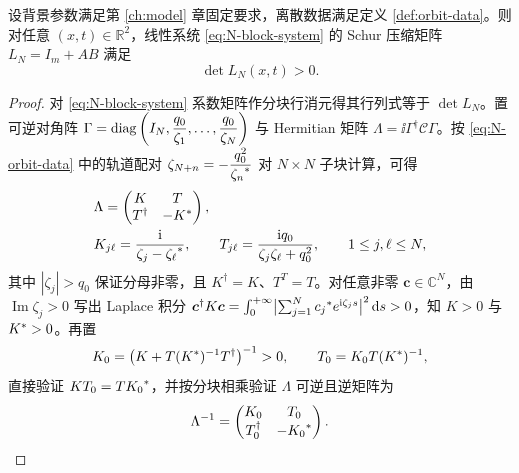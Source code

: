 \begin{lemma}\label{lem:general-N-nondegeneracy}
设背景参数满足第 \ref{ch:model} 章固定要求，离散数据满足定义 \ref{def:orbit-data}。则对任意 $(x,t)\in\mathbb R^2$，线性系统 \eqref{eq:N-block-system} 的 Schur 压缩矩阵 $L_N=I_m+AB$ 满足
\begin{equation}\label{eq:general-N-positive}
\det L_N(x,t)>0.
\end{equation}
\end{lemma}
\begin{proof}
对 \eqref{eq:N-block-system} 系数矩阵作分块行消元得其行列式等于 $\det L_N$。置可逆对角阵 $\Gamma=\operatorname{diag}\left(I_N,\dfrac{q_0}{\zeta_1},\ldots,\dfrac{q_0}{\zeta_N}\right)$ 与 Hermitian 矩阵 $\Lambda=\ii\Gamma^\dagger\mathcal C\Gamma$。按 \eqref{eq:N-orbit-data} 中的轨道配对 $\zeta_{N+n}=-\dfrac{q_0^2}{{\zeta_n}^{*}}$ 对 $N\times N$ 子块计算，可得
\begin{equation}\label{eq:general-N-Cauchy-block}
\begin{aligned}
&\Lambda=\begin{pmatrix}K&T\\T^\dagger&-{K}^{*}\end{pmatrix},\\
&K_{j\ell}=\dfrac{\mathrm{i}}{\zeta_j-{\zeta_\ell}^{*}},\qquad
T_{j\ell}=\dfrac{\mathrm{i} q_0}{\zeta_j\zeta_\ell+q_0^2},\qquad
1\le j,\ell\le N,
\end{aligned}
\end{equation}
其中 $|\zeta_j|>q_0$ 保证分母非零，且 $K^\dagger=K$、$T^T=T$。对任意非零 $\boldsymbol c\in\mathbb C^N$，由 $\operatorname{Im}\zeta_j>0$ 写出 Laplace 积分 $\boldsymbol c^\dagger K\boldsymbol c=\int_0^{+\infty}\bigl|\sum_{j=1}^N {c_j}^{*}e^{\mathrm{i}\zeta_j s}\bigr|^2\,\mathrm{d} s>0$，知 $K>0$ 与 ${K}^{*}>0$。再置
\begin{equation*}
K_0=\bigl(K+T({K}^{*})^{-1}T^\dagger\bigr)^{-1}>0,\qquad
T_0=K_0T({K}^{*})^{-1},
\end{equation*}
直接验证 $KT_0=T{K_0}^{*}$，并按分块相乘验证 $\Lambda$ 可逆且逆矩阵为
\begin{equation}\label{eq:general-N-Sinverse}
\Lambda^{-1}=\begin{pmatrix}K_0&T_0\\T_0^\dagger&-{K_0}^{*}\end{pmatrix}.
\end{equation}


\end{proof}
